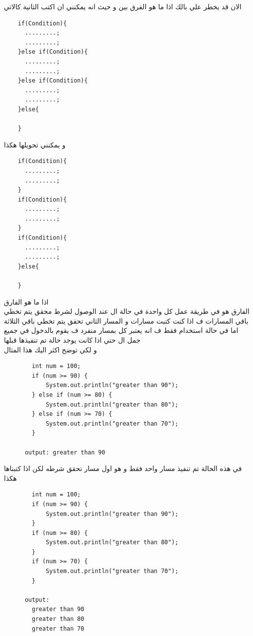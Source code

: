   \begin{AR}
    الان قد يخطر علي بالك اذا ما هو الفرق بين  و حيث انه يمكنني ان اكتب الثانية كالاتي 
  \end{AR}
  \begin{verbatim}
    if(Condition){
      .........;
      .........;
    }else if(Condition){
      .........;
      .........;
    }else if(Condition){
      .........;
      .........;
    }else{

    }
  \end{verbatim}
  \begin{AR}
    و يمكنني تحويلها هكذا
  \end{AR}
  \begin{verbatim}
    if(Condition){
      .........;
      .........;
    }
    if(Condition){
      .........;
      .........;
    }
    if(Condition){
      .........;
      .........;
    }else{

    }
  \end{verbatim}
  \begin{AR}
    اذا ما هو الفارق 
    \\
    الفارق هو في طريقة عمل كل واحدة في حالة ال  عند الوصول 
    لشرط محقق يتم تخطي باقي المسارات ف اذا كنت كتبت  مسارات
    و المسار الثاني تحقق يتم تخطي باقي الثلاثة اما في حالة استخدام  
    فقط ف انه يعتبر كل  بمسار منفرد ف يقوم بالدخول في جميع جمل ال  
    حتي اذا كانت يوجد حالة تم تنفيذها قبلها 
    \\
    و لكي توضح اكثر اليك هذا المثال 
  \end{AR}
  \begin{verbatim}
        int num = 100;
        if (num >= 90) {
            System.out.println("greater than 90");
        } else if (num >= 80) {
            System.out.println("greater than 80");
        } else if (num >= 70) {
            System.out.println("greater than 70");
        }

      output: greater than 90
  \end{verbatim}
  \begin{AR}
    في هذه الحالة تم تنفيذ مسار واحد فقط و هو اول مسار تحقق شرطه لكن اذا كتبناها هكذا
  \end{AR}
  \begin{verbatim}
        int num = 100;
        if (num >= 90) {
            System.out.println("greater than 90");
        }
        if (num >= 80) {
            System.out.println("greater than 80");
        }
        if (num >= 70) {
            System.out.println("greater than 70");
        }

      output: 
        greater than 90
        greater than 80
        greater than 70
  \end{verbatim}

